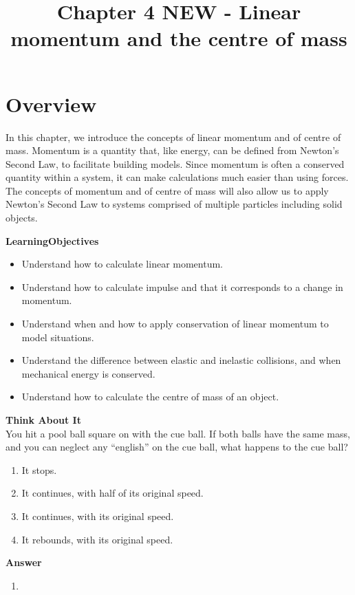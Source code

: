 \documentclass[9pt,arxiv,red]{lapreprint}
\title{Chapter 4 NEW - Linear momentum and the centre of mass}
\begin{document}
\maketitle


\section{Overview}\label{chap:momentumandcm}

In this chapter, we introduce the concepts of linear momentum and of centre of mass. Momentum is a quantity that, like energy, can be defined from Newton's Second Law, to facilitate building models. Since momentum is often a conserved quantity within a system, it can make calculations much easier than using forces. The concepts of momentum and of centre of mass will also allow us to apply Newton's Second Law to systems comprised of multiple particles including solid objects.

\begin{framed}
\textbf{LearningObjectives}\\
\begin{itemize}
\item Understand how to calculate linear momentum.
\item Understand how to calculate impulse and that it corresponds to a change in momentum.
\item Understand when and how to apply conservation of linear momentum to model situations.
\item Understand the difference between elastic and inelastic collisions, and when mechanical energy is conserved.
\item Understand how to calculate the centre of mass of an object.
\end{itemize}
\end{framed}

\begin{framed}
\textbf{Think About It}\\
You hit a pool ball square on with the cue ball. If both balls have the same mass, and you can neglect any ``english'' on the cue ball, what happens to the cue ball?

\begin{enumerate}
\item It stops.
\item It continues, with half of its original speed.
\item It continues, with its original speed.
\item It rebounds, with its original speed.
\end{enumerate}

\begin{framed}
\textbf{Answer}\\
\begin{enumerate}
\item
\end{enumerate}
\end{framed}
\end{framed}
\end{document}
